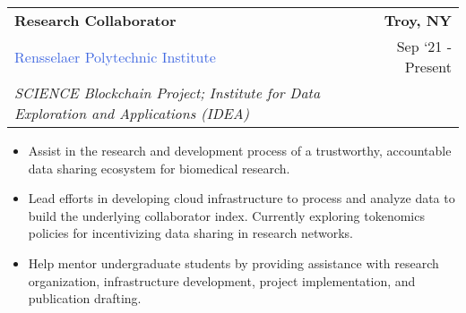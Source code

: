 \documentclass[10pt]{article}
\newcommand{\highlightcolor}{RoyalBlue}
\newcommand{\tabularxwidth}{\textwidth}
\begin{document}
    
    \begin{minipage}{\tabularxwidth}

        \begin{tabularx}{\tabularxwidth}{X r}
            \textbf{Research Collaborator} & \textbf{Troy, 
        NY} \\
            
    
    
    

    
        \textcolor{\highlightcolor}{Rensselaer Polytechnic Institute} & 
        
    Sep ‘21 - Present \\
        
            \textit{SCIENCE Blockchain Project;}
                \textit{Institute for Data Exploration and Applications (IDEA)} & \\
        
    
            
        \end{tabularx}

        \begin{itemize}[noitemsep, topsep=3pt, parsep=0pt, partopsep=0pt]
            
                \item 
    Assist in the research and development process of a trustworthy, accountable data sharing ecosystem for biomedical research.
            
                \item 
    Lead efforts in developing cloud infrastructure to process and analyze data to build the underlying collaborator index. Currently exploring tokenomics policies for incentivizing data sharing in research networks.
            
                \item 
    Help mentor undergraduate students by providing assistance with research organization, infrastructure development, project implementation, and publication drafting.
            
        \end{itemize}

        
            \vspace{.3em}
        

    \end{minipage}
    
\end{document}
